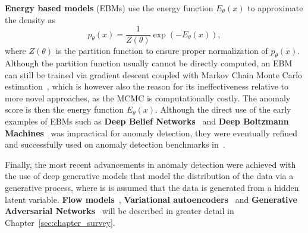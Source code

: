 \textbf{Energy based models} (EBMs) use the energy function $E_{\theta}(x)$ to approximate the density as
\begin{equation} \label{eq:ebm}
	p_{\theta}(x) =  \frac{1}{Z(\theta)} \exp (- E_{\theta}(x)),
\end{equation}
where $Z(\theta)$ is the partition function to ensure proper normalization of $p_{\theta}(x)$. Although the partition function usually cannot be directly computed, an EBM can still be trained via gradient descent coupled with Markov Chain Monte Carlo estimation~\cite{hinton2002training}, which is however also the reason for its ineffectiveness relative to more novel approaches, as the MCMC is computationally costly. The anomaly score is then the energy function $E_{\theta}(x)$. Although the direct use of the early examples of EBMs such as \textbf{Deep Belief Networks}~\cite{hinton2006fast} and \textbf{Deep Boltzmann Machines}~\cite{salakhutdinov2010efficient} was impractical for anomaly detection, they were eventually refined and successfully used on anomaly detection benchmarks in~\cite{zhai2016deep}. 

Finally, the most recent advancements in anomaly detection were achieved with the use of deep generative models that model the distribution of the data via a generative process, where is is assumed that the data is generated from a hidden latent variable. \textbf{Flow models}~\cite{dinh2014nice}, \textbf{Variational autoencoders}~\cite{kingma2013vae} and \textbf{Generative Adversarial Networks}~\cite{goodfellow2014gan}  will be described in greater detail in Chapter~\ref{sec:chapter_survey}.

